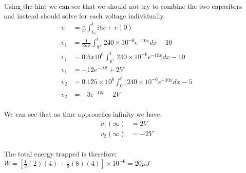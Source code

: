 Using the hint we can see that we should not try to combine the two capacitors and instead should solve for each voltage individually. 
\begin{align*}
	v &= \frac{1}{C}\int_{t_0}^{t} i tx + v(0) \\
	v_1 &= \frac{1}{2 \mu F}\int_{0^{+}}^{t} 240 \times 10^{-6}e^{-10x} dx - 10\\
	v_1 &= 0.5 x 10^6 \int_{0^{+}}^{t} 240 \times 10^{-6}e^{-10x} dx - 10 \\
	v_1 &= -12e^{-10t} + 2 V \\
	v_2 &= 0.125 \times 10^{6} \int_{0^{+}}^{t} 240 \times 10^{-6}e^{-10x} dx - 5 \\
	v_2 &= -3e^{-10t} - 2 V \\
\end{align*}

We can see that as time approaches infinity we have: 
\begin{align*}
	v_1(\infty) &= 2V \\
	v_2(\infty) &= -2V \\
\end{align*}

The total energy trapped is therefore:
\\ $W = \left[\frac{1}{2}(2)(4) + \frac{1}{2}(8)(4)\right] \times 10^{-6} = 20 \mu J $\\


